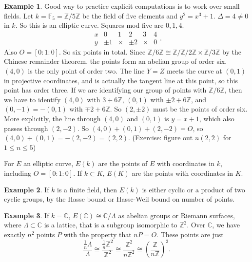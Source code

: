 \documentclass{article}
\newcommand{\F}{\mathbb{F}}
\newcommand{\Z}{\mathbb{Z}}
\newcommand{\C}{\mathbb{C}}
\newcommand{\rb}[1]{\left( #1 \right)}
\renewcommand{\sb}[1]{\left[ #1 \right]}
\theoremstyle{definition}\newtheorem{definition}{Definition}[section]
\theoremstyle{definition}\newtheorem{remark}[definition]{Remark}
\theoremstyle{definition}\newtheorem*{example}{Example}
\theoremstyle{definition}\newtheorem*{note}{Note}
\begin{document}
\begin{example}
Good way to practice explicit computations is to work over small fields. Let $ k = \F_5 = \Z / 5\Z $ be the field of five elements and $ y^2 = x^3 + 1 $. $ \Delta = 4 \ne 0 $ in $ k $. So this is an elliptic curve. Squares mod five are $ 0, 1, 4 $.
$$
\begin{array}{c|ccccc}
x & 0 & 1 & 2 & 3 & 4 \\
\hline
y & \pm 1 & \times & \pm 2 & \times & 0
\end{array}.
$$
Also $ O = \sb{0 : 1 : 0} $. So six points in total. Since $ \Z / 6\Z \cong \Z / \Z / 2\Z \times \Z / 3\Z $ by the Chinese remainder theorem, the points form an abelian group of order six. $ \rb{4, 0} $ is the only point of order two. The line $ Y = Z $ meets the curve at $ \rb{0, 1} $ in projective coordinates, and is actually the tangent line at this point, so this point has order three. If we are identifying our group of points with $ \Z / 6\Z $, then we have to identify $ \rb{4, 0} $ with $ 3 + 6\Z $, $ \rb{0, 1} $ with $ \pm 2 + 6\Z $, and $ \rb{0, -1} = -\rb{0, 1} $ with $ \mp 2 + 6\Z $. So $ \rb{2, \pm 2} $ must be the points of order six. More explicitly, the line through $ \rb{4, 0} $ and $ \rb{0, 1} $ is $ y = x + 1 $, which also passes through $ \rb{2, -2} $. So $ \rb{4, 0} + \rb{0, 1} + \rb{2, -2} = O $, so $ \rb{4, 0} + \rb{0, 1} = -\rb{2, -2} = \rb{2, 2} $. (Exercise: figure out $ n\rb{2, 2} $ for $ 1 \le n \le 5 $)
\end{example}

For $ E $ an elliptic curve, $ E\rb{k} $ are the points of $ E $ with coordinates in $ k $, including $ O = \sb{0 : 1 : 0} $. If $ k \subset K $, $ E\rb{K} $ are the points with coordinates in $ K $.

\begin{example}
If $ k $ is a finite field, then $ E\rb{k} $ is either cyclic or a product of two cyclic groups, by the Hasse bound or Hasse-Weil bound on number of points.
\end{example}

\begin{example}
If $ k = \C $, $ E\rb{\C} \cong \C / \Lambda $ as abelian groups or Riemann surfaces, where $ \Lambda \subset \C $ is a lattice, that is a subgroup isomorphic to $ \Z^2 $. Over $ \C $, we have exactly $ n^2 $ points $ P $ with the property that $ nP = O $. These points are just
$$ \dfrac{\tfrac{1}{n}\Lambda}{\Lambda} \cong \dfrac{\tfrac{1}{n}\Z^2}{\Z^2} \cong \dfrac{\Z^2}{n\Z^2} \cong \rb{\dfrac{\Z}{n\Z}}^2. $$
\end{example}
\end{document}
